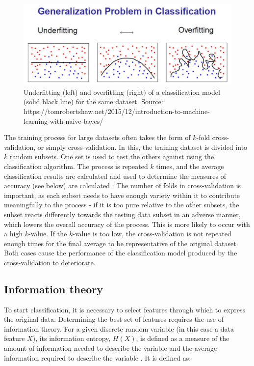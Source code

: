 \documentclass[12pt]{article}
\begin{document}
\begin{figure}[h!]
\begin{center}
\includegraphics[scale=0.3]{overfitting.jpg}
\caption{Underfitting (left) and overfitting (right) of a classification model (solid black line) for the same dataset. Source: https://tomrobertshaw.net/2015/12/introduction-to-machine-learning-with-naive-bayes/}
\label{fitting}
\end{center}
\end{figure}

The training process for large datasets often takes the form of $k$-fold cross-validation, or simply cross-validation. In this, the training dataset is divided into $k$ random subsets. One set is used to test the others against using the classification algorithm. The process is repeated $k$ times, and the average classification results are calculated and used to determine the measures of accuracy (see below) are calculated \cite{kohavi1995study}. The number of folds in cross-validation is important, as each subset needs to have enough variety within it to contribute meaningfully to the process - if it is too pure relative to the other subsets, the subset reacts differently towards the testing data subset in an adverse manner, which lowers the overall accuracy of the process. This is more likely to occur with a high $k$-value. If the $k$-value is too low, the cross-validation is not repeated enough times for the final average to be representative of the original dataset. Both cases cause the performance of the classification model produced by the cross-validation to deteriorate.

\subsection{Information theory}

To start classification, it is necessary to select features through which to express the original data. Determining the best set of features requires the use of information theory. For a given discrete random variable (in this case a data feature $X$), its information entropy, $H(X)$, is defined as a measure of the amount of information needed to describe the variable and the average information required to describe the variable \cite{bennasar2015feature}. It is defined as:
\end{document}
